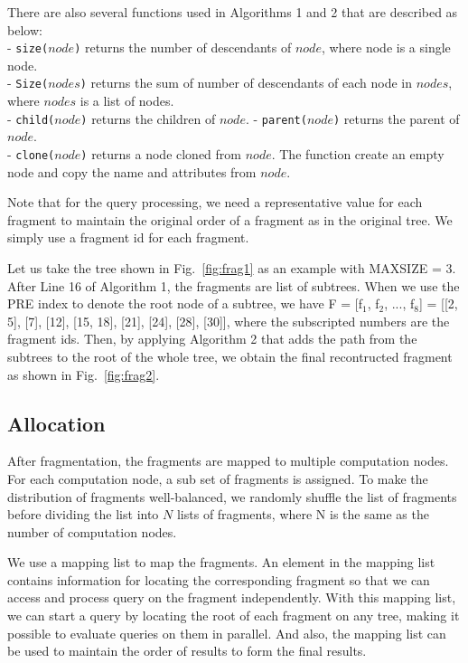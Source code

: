 There are also several functions used in Algorithms 1 and 2 that are described 
as below:\\
- \texttt{size($node$)} returns the number of descendants of $node$, where node
is a single node.\\
- \texttt{Size($nodes$)} returns the sum of number of descendants of each node
in $nodes$, where $nodes$ is a list of nodes.\\
- \texttt{child($node$)} returns the children of $node$.
- \texttt{parent($node$)} returns the parent of $node$.\\
- \texttt{clone($node$)} returns a node cloned from $node$. The function create
an empty node and copy the name and attributes from $node$.

Note that for the query processing, we need a representative value for each
fragment to maintain the original order of a fragment as in the original tree.
We simply use a fragment id for each fragment.

Let us take the tree shown in Fig.~\ref{fig:frag1} as an example with MAXSIZE =
3. After Line 16 of Algorithm 1, the fragments are list of subtrees. When we use
the PRE index to denote the root node of a subtree, we have F = [f$_1$, f$_2$, ...,
f$_8$] = [[2, 5], [7], [12], [15, 18], [21], [24], [28], [30]], where the
subscripted numbers are the fragment ids. Then, by applying Algorithm 2 that adds
the path from the subtrees to the root of the whole tree, we obtain the final
recontructed fragment as shown in Fig.~\ref{fig:frag2}.

\subsection{Allocation}

After fragmentation, the fragments are mapped to multiple computation nodes. For each
computation node, a sub set of fragments is assigned. To make the distribution
of fragments well-balanced, we randomly shuffle the list of fragments before
dividing the list into $N$ lists of fragments, where N is the same as the number
of computation nodes. 

We use a mapping list to map the fragments. An element in the mapping list
contains information for locating the corresponding fragment so that we can
access and process query on the fragment independently.  With this mapping list,
we can start a query by locating the root of each fragment on any tree, making
it possible to evaluate queries on them in parallel.  And also, the mapping list
can be used to maintain the order of results to form the final results.

